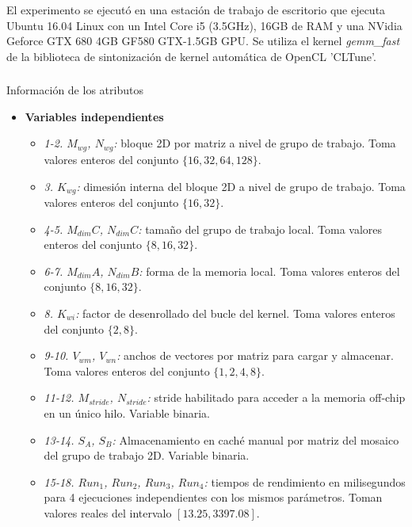 \documentclass[osajnl,twocolumn,showpacs,superscriptaddress,10pt]{revtex4-1} %
\begin{document}
El experimento se ejecutó en una estación de trabajo de escritorio que ejecuta Ubuntu 16.04 Linux con un Intel Core i5 (3.5GHz), 16GB de RAM y una NVidia Geforce GTX 680 4GB GF580 GTX-1.5GB GPU. Se utiliza el kernel \textit{gemm\_fast} de la biblioteca de sintonización de kernel automática de OpenCL 'CLTune'. \\

\subsubsection{}{Información de los atributos}

\begin{itemize}
    \item \textbf{Variables independientes}

    \begin{itemize}
        \item \textit{1-2. $M_{wg}$, $N_{wg}$:} bloque 2D por matriz a nivel de grupo de trabajo. Toma valores enteros del conjunto $\{16, 32, 64, 128\}$.
        \item \textit{3. $K_{wg}$:} dimesión interna del bloque 2D a nivel de grupo de trabajo. Toma valores enteros del conjunto $\{16, 32\}$.
        \item \textit{4-5. $M_{dim}C$, $N_{dim}C$:} tamaño del grupo de trabajo local. Toma valores enteros del conjunto $\{8, 16, 32\}$.
        \item \textit{6-7. $M_{dim}A$, $N_{dim}B$:} forma de la memoria local. Toma valores enteros del conjunto $\{8, 16, 32\}$.
        \item \textit{8. $K_{wi}$:} factor de desenrollado del bucle del kernel. Toma valores enteros del conjunto $\{2, 8\}$.
        \item \textit{9-10. $V_{wm}$, $V_{wn}$:} anchos de vectores por matriz para cargar y almacenar. Toma valores enteros del conjunto $\{1, 2, 4, 8\}$.
        \item \textit{11-12. $M_{stride}$, $N_{stride}$:} stride habilitado para acceder a la memoria off-chip en un único hilo. Variable binaria.
        \item \textit{13-14. $S_{A}$, $S_{B}$:} Almacenamiento en caché manual por matriz del mosaico del grupo de trabajo 2D. Variable binaria.
    \end{itemize}

    \begin{itemize}
        \item \textit{15-18. $Run_1$, $Run_2$, $Run_3$, $Run_4$:} tiempos de rendimiento en milisegundos para 4 ejecuciones independientes con los mismos parámetros. Toman valores reales del intervalo $[13.25, 3397.08]$.
    \end{itemize}
\end{itemize}
\end{document}
